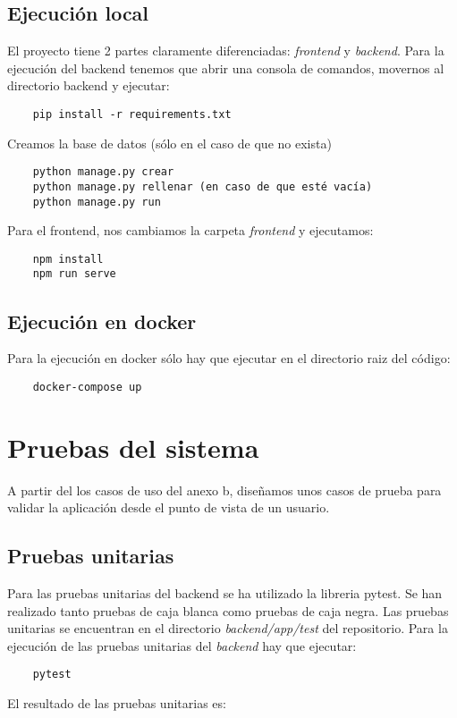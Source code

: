 \subsection {Ejecución local}
El proyecto tiene 2 partes claramente diferenciadas: \emph{frontend} y \emph{backend}.
Para la ejecución del backend tenemos que abrir una consola de comandos, movernos al directorio backend 
y ejecutar:
\begin{verbatim}
	pip install -r requirements.txt
\end{verbatim}

Creamos la base de datos (sólo en el caso de que no exista)
\begin{verbatim}
	python manage.py crear
	python manage.py rellenar (en caso de que esté vacía)
	python manage.py run
\end{verbatim}

Para el frontend, nos cambiamos la carpeta \emph{frontend} y ejecutamos:
\begin{verbatim}
	npm install
	npm run serve
\end{verbatim}

\subsection {Ejecución en docker}
Para la ejecución en docker sólo hay que ejecutar en el directorio raiz del código:
\begin{verbatim}
	docker-compose up
\end{verbatim}
\newpage
\section{Pruebas del sistema}

A partir del los casos de uso del anexo b, diseñamos unos casos de prueba para 
validar la aplicación desde el punto de vista de un usuario.

\subsection{Pruebas unitarias}
Para las pruebas unitarias del backend se ha utilizado la libreria pytest.
Se han realizado tanto pruebas de caja blanca como pruebas de caja negra.
Las pruebas unitarias se encuentran en el directorio \emph{backend/app/test} del repositorio.
Para la ejecución de las pruebas unitarias del \emph{backend} hay que ejecutar:
\begin{verbatim}
	pytest
\end{verbatim}
El resultado de las pruebas unitarias es:
\newpage

